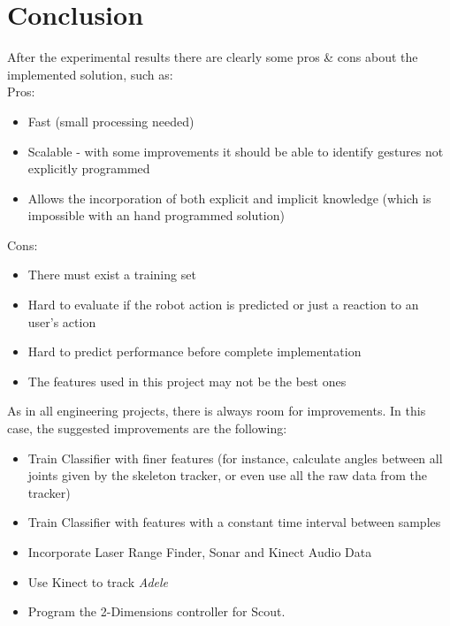 \section{Conclusion}
After the experimental results there are clearly some pros \& cons about the implemented solution, such as:\\

Pros:
\begin{itemize}
\item Fast (small processing needed)
\item Scalable - with some improvements it should be able to identify gestures not explicitly programmed
\item Allows the incorporation of both explicit and implicit knowledge (which is impossible with an hand programmed solution)
\end{itemize}
Cons:
\begin{itemize}
\item There must exist a training set
\item Hard to evaluate if the robot action is predicted or just a reaction to an user's action
\item Hard to predict performance before complete implementation
\item The features used in this project may not be the best ones
\end{itemize}

As in all engineering projects, there is always room for improvements. In this case, the suggested improvements are the following:
\begin{itemize}
\item Train Classifier with finer features (for instance, calculate angles between all joints given by the skeleton tracker, or even use all the raw data from the tracker)
\item Train Classifier with features with a constant time interval between samples
\item Incorporate Laser Range Finder, Sonar and Kinect Audio Data
\item Use Kinect to track \textit{Adele}
\item Program the 2-Dimensions controller for Scout.
\end{itemize}